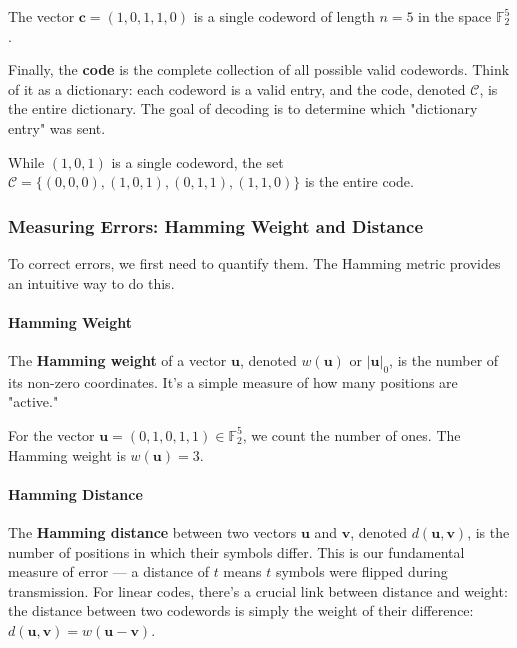 \documentclass{article}
\begin{document}
\begin{tcolorbox}[title=Example: A Binary Codeword]
The vector $\mathbf{c} = (1, 0, 1, 1, 0)$ is a single codeword of length $n=5$ in the space $\mathbb{F}_2^5$.
\end{tcolorbox}

Finally, the \textbf{code} is the complete collection of all possible valid codewords. Think of it as a dictionary: each codeword is a valid entry, and the code, denoted $\mathcal{C}$, is the entire dictionary. The goal of decoding is to determine which "dictionary entry" was sent.

\begin{tcolorbox}[title=Example: A Simple Code]
While $(1,0,1)$ is a single codeword, the set $\mathcal{C} = \{ (0,0,0), (1,0,1), (0,1,1), (1,1,0) \}$ is the entire code.
\end{tcolorbox}

\subsubsection{Measuring Errors: Hamming Weight and Distance}
To correct errors, we first need to quantify them. The Hamming metric provides an intuitive way to do this.

\paragraph{Hamming Weight}
The \textbf{Hamming weight} of a vector $\mathbf{u}$, denoted $w(\mathbf{u})$ or $|\mathbf{u}|_0$, is the number of its non-zero coordinates. It's a simple measure of how many positions are "active."

\begin{tcolorbox}[title=Example: Hamming Weight]
For the vector $\mathbf{u} = (0, 1, 0, 1, 1) \in \mathbb{F}_2^5$, we count the number of ones. The Hamming weight is $w(\mathbf{u}) = 3$.
\end{tcolorbox}

\paragraph{Hamming Distance}
The \textbf{Hamming distance} between two vectors $\mathbf{u}$ and $\mathbf{v}$, denoted $d(\mathbf{u}, \mathbf{v})$, is the number of positions in which their symbols differ. This is our fundamental measure of error — a distance of $t$ means $t$ symbols were flipped during transmission. For linear codes, there's a crucial link between distance and weight: the distance between two codewords is simply the weight of their difference: $d(\mathbf{u}, \mathbf{v}) = w(\mathbf{u} - \mathbf{v})$.
\end{document}
